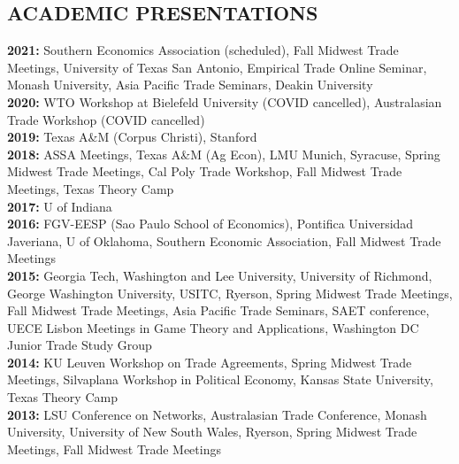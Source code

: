 \documentclass[11pt]{res}
\begin{document}
\begin{resume}

\section{ACADEMIC PRESENTATIONS}\vspace{1.5mm}
{\bf 2021:} Southern Economics Association (scheduled), Fall Midwest Trade Meetings, University of Texas San Antonio, Empirical Trade Online Seminar, Monash University, Asia Pacific Trade Seminars, Deakin University \vspace{1.5mm}\\
{\bf 2020:} WTO Workshop at Bielefeld University (COVID cancelled), Australasian Trade Workshop (COVID cancelled)\vspace{1.5mm}\\
{\bf 2019:} Texas A\&M (Corpus Christi), Stanford \vspace{1.5mm}\\
{\bf 2018:} ASSA Meetings, Texas A\&M (Ag Econ), LMU Munich, Syracuse, Spring Midwest Trade Meetings, Cal Poly Trade Workshop, Fall Midwest Trade Meetings, Texas Theory Camp \vspace{1.5mm}\\
{\bf 2017:} U of Indiana \vspace{1.5mm}\\
{\bf 2016:} FGV-EESP (Sao Paulo School of Economics), Pontifica Universidad Javeriana, U of Oklahoma, Southern Economic Association, Fall Midwest Trade Meetings\vspace{1.5mm}\\
{\bf 2015:} Georgia Tech, Washington and Lee University, University of Richmond, George Washington University, USITC, Ryerson, Spring Midwest Trade Meetings, Fall Midwest Trade Meetings, Asia Pacific Trade Seminars, SAET conference, UECE Lisbon Meetings in Game Theory and Applications, Washington DC Junior Trade Study Group\vspace{1.5mm}\\
{\bf 2014:} KU Leuven Workshop on Trade Agreements, Spring Midwest Trade Meetings, Silvaplana Workshop in Political Economy, Kansas State University, Texas Theory Camp\vspace{1.5mm}\\
{\bf 2013:} LSU Conference on Networks, Australasian Trade Conference, Monash University, University of New South Wales, Ryerson, Spring Midwest Trade Meetings, Fall Midwest Trade Meetings \vspace{1.5mm}\\

\end{resume}
\end{document}
